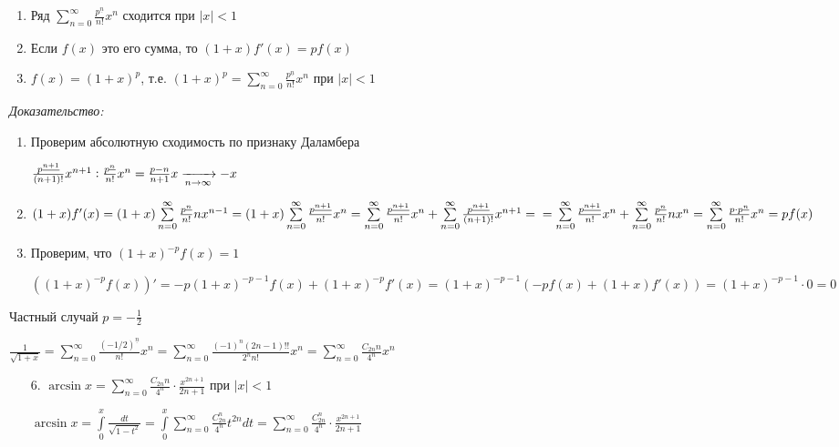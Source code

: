 \documentclass[12pt]{article}
\begin{document}
\begin{theo}{}
    \begin{enumerate}
        \item Ряд $\sum\limits_{n = 0}^{\infty} \frac{p^{\underline{n}}}{n!} x^n$ сходится при $|x| < 1$
        \item Если $f(x)$ это его сумма, то $(1 + x)f'(x) = pf(x)$
        \item $f(x) = (1 + x)^p$, т.е. $(1 + x)^p = \sum\limits_{n = 0}^\infty \frac{p^{\underline{n}}}{n!} x^n$ при $|x| < 1$
    \end{enumerate}
\end{theo}

\textit{Доказательство:}

\begin{enumerate}
    \item Проверим абсолютную сходимость по признаку Даламбера
    
    $\frac{p^{\underline{n + 1}}}{(n + 1)!} x^{n + 1} : \frac{p^{\underline{n}}}{n!} x^n = \frac{p - n}{n + 1} x \xrightarrow[n\to\infty]{} -x$

    \item $(1 + x)f'(x) = (1 + x)\sum\limits_{n = 0}^\infty \frac{p^{\underline{n}}}{n!} nx^{n - 1} = (1 + x)\sum\limits_{n = 0}^\infty \frac{p^{\underline{n + 1}}}{n!} x^n = \sum\limits_{n = 0}^\infty \frac{p^{\underline{n + 1}}}{n!} x^n + \sum\limits_{n = 0}^\infty \frac{p^{\underline{n + 1}}}{(n + 1)!} x^{n + 1} = \\ = \sum\limits_{n = 0}^\infty \frac{p^{\underline{n + 1}}}{n!}x^n + \sum\limits_{n = 0}^\infty \frac{p^{\underline{n}}}{n!} nx^n = \sum\limits_{n = 0}^\infty \frac{p \cdot p^{\underline{n}}}{n!} x^n = pf(x)$
    
    \item Проверим, что $(1 + x)^{-p}f(x) = 1$
    
    $((1 + x)^{-p}f(x))' = -p(1 + x)^{-p-1}f(x) + (1 + x)^{-p}f'(x) = (1 + x)^{-p-1}(-pf(x) + (1 + x)f'(x)) = (1 + x)^{-p-1} \cdot 0 = 0$
\end{enumerate}

\begin{Example}{Частный случай}
    $p = -\frac{1}{2}$

    $\frac{1}{\sqrt{1 + x}} = \sum\limits_{n = 0}^\infty \frac{(-1/2)^{\underline{n}}}{n!} x^n = \sum\limits_{n = 0}^\infty \frac{(-1)^{n}(2n - 1)!!}{2^n n!} x^n = \sum\limits_{n = 0}^\infty \frac{C_{2n}{n}}{4^n} x^n$
\end{Example}

\begin{Remark}{}
    \begin{enumerate}
        \item[6.] $\arcsin{x} = \sum\limits_{n = 0}^\infty \frac{C_{2n}{n}}{4^n} \cdot \frac{x^{2n + 1}}{2n + 1}$ при $|x| < 1$
        
        $\arcsin{x} = \int\limits_0^x \frac{dt}{\sqrt{1 - t^2}} = \int\limits_0^x \sum\limits_{n = 0}^\infty \frac{C_{2n}^n}{4^n}t^{2n}dt = \sum\limits_{n = 0}^\infty \frac{C_{2n}^n}{4^n} \cdot \frac{x^{2n + 1}}{2n + 1}$
    \end{enumerate}
\end{Remark}
\end{document}
